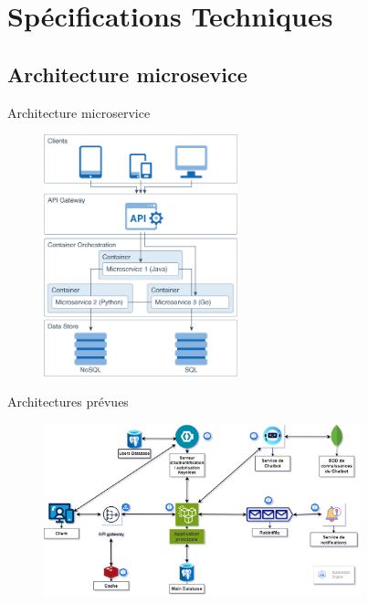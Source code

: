 \documentclass{beamer}
\begin{document}
\section{Spécifications Techniques}



\subsection{Architecture microsevice}



\begin{frame}{Architecture microservice}
   \begin{figure}[htpb]
        \centering
        \includegraphics[height=7cm]{pic/microservice_architecture_presentation.png}
    \end{figure}
\end{frame}


\begin{frame}{Architectures prévues}
    \begin{figure}[htpb]
         \centering
         \includegraphics[height=5cm]{pic/Code212_architecture.drawio (1).png}
     \end{figure}
 \end{frame}
\end{document}
